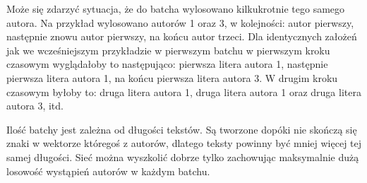 Może się zdarzyć sytuacja, że do batcha wylosowano kilkukrotnie tego samego autora. Na przykład wylosowano
autorów 1 oraz 3, w kolejności: autor pierwszy, następnie znowu autor pierwszy, na końcu autor trzeci.
Dla identycznych założeń jak we wcześniejszym przykładzie w pierwszym batchu w pierwszym kroku czasowym wyglądałoby to
 następująco: pierwsza litera autora 1, następnie pierwsza litera autora 1,
na końcu pierwsza litera autora 3. W drugim kroku czasowym byłoby to:
druga litera autora 1, druga litera autora 1 oraz druga litera autora 3, itd.

Ilość batchy jest zależna od długości tekstów. Są tworzone dopóki nie skończą się znaki w wektorze
któregoś z autorów, dlatego teksty powinny być mniej więcej tej samej długości. Sieć można
wyszkolić dobrze tylko zachowując maksymalnie dużą losowość wystąpień autorów w każdym batchu.
